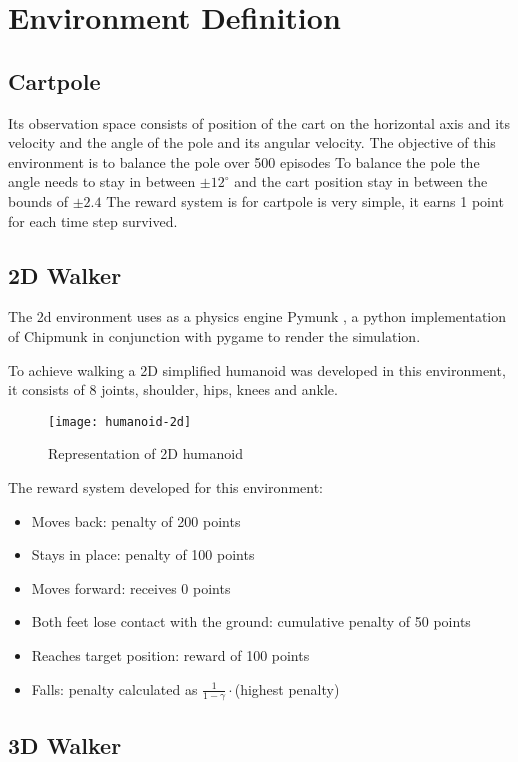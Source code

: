 \section{Environment Definition}


\subsection{Cartpole}
Its observation space consists of position of the cart on the horizontal axis and its velocity and the angle of the pole and its angular velocity.
The objective of this environment is to balance the pole over 500 episodes
To balance the pole the angle needs to stay in between $\pm12^\circ$ and the cart position stay in between the bounds of $\pm2.4$
The reward system is for cartpole is very simple, it earns 1 point for each time step survived.
\cite{cartpole}

\subsection{2D Walker}
The 2d environment uses as a physics engine Pymunk \cite{pymunk}, a python implementation of Chipmunk\cite{chipmunk} 
in conjunction with pygame \cite{pygame} to render the simulation. 

To achieve walking a 2D simplified humanoid was developed in this environment, it consists of 8 joints, shoulder, hips, knees and ankle.
\begin{figure}[h]
    \centering
    \texttt{[image: humanoid-2d]}
    \caption{Representation of 2D humanoid}
\end{figure}

The reward system developed for this environment:
\begin{itemize}
    \item Moves back: penalty of 200 points
    \item Stays in place: penalty of 100 points
    \item Moves forward: receives 0 points
    \item Both feet lose contact with the ground: cumulative penalty of 50 points
    \item Reaches target position: reward of 100 points
    \item Falls: penalty calculated as $\frac{1}{1-\gamma}\cdot$(highest penalty) 
\end{itemize}

\subsection{3D Walker}


\cite{ros-gym}
